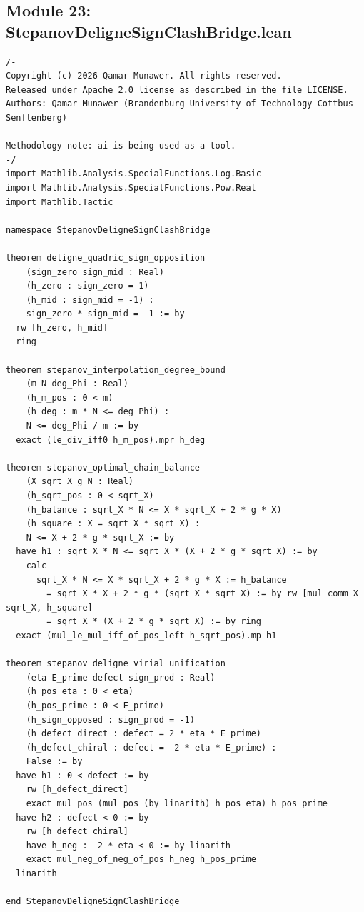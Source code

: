\documentclass[11pt,a4paper]{article}
\begin{document}
\subsection*{Module 23: StepanovDeligneSignClashBridge.lean}
\begin{lstlisting}[language=Lean4, caption={Stepanov-Deligne Bilinear Sign Clash Bridge (Module 23)}]
/-
Copyright (c) 2026 Qamar Munawer. All rights reserved.
Released under Apache 2.0 license as described in the file LICENSE.
Authors: Qamar Munawer (Brandenburg University of Technology Cottbus-Senftenberg)

Methodology note: ai is being used as a tool.
-/
import Mathlib.Analysis.SpecialFunctions.Log.Basic
import Mathlib.Analysis.SpecialFunctions.Pow.Real
import Mathlib.Tactic

namespace StepanovDeligneSignClashBridge

theorem deligne_quadric_sign_opposition
    (sign_zero sign_mid : Real)
    (h_zero : sign_zero = 1)
    (h_mid : sign_mid = -1) :
    sign_zero * sign_mid = -1 := by
  rw [h_zero, h_mid]
  ring

theorem stepanov_interpolation_degree_bound
    (m N deg_Phi : Real)
    (h_m_pos : 0 < m)
    (h_deg : m * N <= deg_Phi) :
    N <= deg_Phi / m := by
  exact (le_div_iff0 h_m_pos).mpr h_deg

theorem stepanov_optimal_chain_balance
    (X sqrt_X g N : Real)
    (h_sqrt_pos : 0 < sqrt_X)
    (h_balance : sqrt_X * N <= X * sqrt_X + 2 * g * X)
    (h_square : X = sqrt_X * sqrt_X) :
    N <= X + 2 * g * sqrt_X := by
  have h1 : sqrt_X * N <= sqrt_X * (X + 2 * g * sqrt_X) := by
    calc
      sqrt_X * N <= X * sqrt_X + 2 * g * X := h_balance
      _ = sqrt_X * X + 2 * g * (sqrt_X * sqrt_X) := by rw [mul_comm X sqrt_X, h_square]
      _ = sqrt_X * (X + 2 * g * sqrt_X) := by ring
  exact (mul_le_mul_iff_of_pos_left h_sqrt_pos).mp h1

theorem stepanov_deligne_virial_unification
    (eta E_prime defect sign_prod : Real)
    (h_pos_eta : 0 < eta)
    (h_pos_prime : 0 < E_prime)
    (h_sign_opposed : sign_prod = -1)
    (h_defect_direct : defect = 2 * eta * E_prime)
    (h_defect_chiral : defect = -2 * eta * E_prime) :
    False := by
  have h1 : 0 < defect := by
    rw [h_defect_direct]
    exact mul_pos (mul_pos (by linarith) h_pos_eta) h_pos_prime
  have h2 : defect < 0 := by
    rw [h_defect_chiral]
    have h_neg : -2 * eta < 0 := by linarith
    exact mul_neg_of_neg_of_pos h_neg h_pos_prime
  linarith

end StepanovDeligneSignClashBridge
\end{lstlisting}
\end{document}
